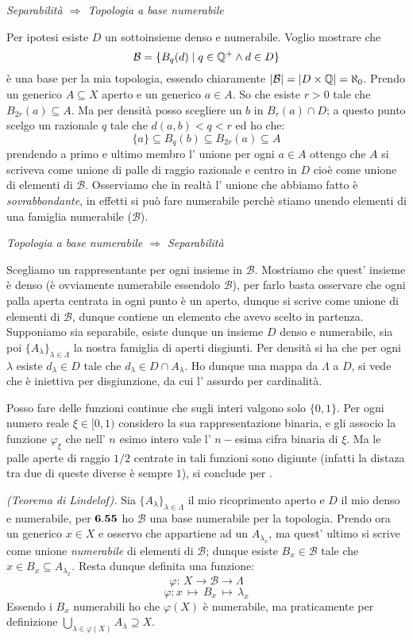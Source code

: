 \centerline{{\it Separabilità $\Rightarrow$ Topologia a base numerabile}}
Per ipotesi esiste $D$ un sottoinsieme denso e numerabile. Voglio mostrare che
$$\mathcal{B}=\{B_q(d)\mid q\in\mathbb{Q}^+ \wedge d\in D\}$$
è una base per la mia topologia, essendo chiaramente $\vert{\mathcal{B}}\vert=\vert{D\times\mathbb{Q}}\vert=\aleph_0$. Prendo un generico $A\subseteq X$ aperto e un generico $a\in A$. So che esiste $r>0$ tale che $B_{2r}(a)\subseteq A$. Ma per densità posso scegliere un $b$ in $B_r(a)\cap D$; a questo punto scelgo un razionale $q$ tale che $d(a,b)<q<r$ ed ho che:
$$ \{a\}\subseteq B_q(b)\subseteq B_{2r}(a)\subseteq A $$
prendendo a primo e ultimo membro l' unione per ogni $a\in A$ ottengo che $A$ si scriveva come unione di palle di raggio razionale e centro in $D$ cioè come unione di elementi di $\mathcal{B}$. Osserviamo che in realtà l' unione che abbiamo fatto è {\it sovrabbondante}, in effetti si può fare numerabile perchè stiamo unendo elementi di una famiglia numerabile ($\mathcal{B}$).\\

\centerline{{\it Topologia a base numerabile $\Rightarrow$ Separabilità}}
Scegliamo un rappresentante per ogni insieme in $\mathcal{B}$. Mostriamo che quest' insieme è denso (è ovviamente numerabile essendolo $\mathcal{B}$), per farlo basta osservare che ogni palla aperta centrata in ogni punto è un aperto, dunque si scrive come unione di elementi di $\mathcal{B}$, dunque contiene un elemento che avevo scelto in partenza.\\

 Supponiamo sia separabile, esiste dunque un insieme $D$ denso e numerabile, sia poi $\{A_{\lambda}\}_{\lambda\in\Lambda}$ la nostra famiglia di aperti disgiunti. Per densità si ha che per ogni $\lambda$ esiste $d_{\lambda}\in D$ tale che $d_{\lambda}\in D \cap A_{\lambda}$. Ho dunque una mappa da $\Lambda$ a $D$, si vede che è iniettiva per disgiunzione, da cui l' assurdo per cardinalità.

 Posso fare delle funzioni continue che sugli interi valgono solo $\{0, 1\}$. Per ogni numero reale $\xi \in[0,1)$ considero la sua rappresentazione binaria, e gli associo la funzione $\varphi _{\xi}$ che nell' $n$ esimo intero vale l' $n-$esima cifra binaria di $\xi$. Ma le palle aperte di raggio $1/2$ centrate in tali funzioni sono digiunte (infatti la distaza tra due di queste diverse è sempre $1$), si conclude per .

 {\it (Teorema di Lindelof).} Sia $\{A_{\lambda}\}_{\lambda\in\Lambda}$ il mio ricoprimento aperto e $D$ il mio denso e numerabile, per ${\bf 6.55}$ ho $\mathcal{B}$ una base numerabile per la topologia. Prendo ora un generico $x\in X$ e osservo che appartiene ad un $A_{\lambda_x}$, ma quest' ultimo si scrive come unione {\it numerabile} di elementi di ${\mathcal{B}}$; dunque esiste $B_x \in \mathcal{B}$ tale che $x\in B_x\subseteq A_{\lambda_x}$. Resta dunque definita una funzione:
$$ \varphi:\,  X \rightarrow \mathcal{B} \rightarrow \Lambda $$
$$ \varphi: x\, \mapsto\, B_x\, \mapsto \, \lambda_x $$
Essendo i $B_x$ numerabili ho che $\varphi(X)$ è numerabile, ma praticamente per definizione $\displaystyle \bigcup_{\lambda \in \varphi (X)}A_{\lambda}\supseteq X$.\\

